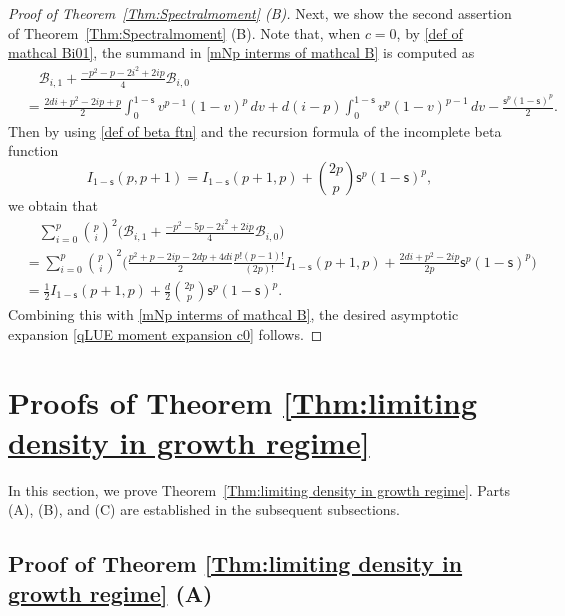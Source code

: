 \documentclass{amsart}
\theoremstyle{plain}
\theoremstyle{remark}
\numberwithin{equation}{section}
\begin{document}
\begin{proof}[Proof of Theorem~\ref{Thm:Spectralmoment} (B)]
    Next, we show the second assertion of Theorem~\ref{Thm:Spectralmoment} (B). 
    Note that, when $c=0$, by \eqref{def of mathcal Bi01}, the summand in \eqref{mNp interms of mathcal B} is computed as 
    \begin{align*}
        &\quad \mathcal{B}_{i,1}+\frac{-p^2-p-2i^2+2ip}{4}\mathcal{B}_{i,0}
        \\
        &=\frac{2di+p^2-2ip+p}{2}\int_{0}^{1- \mathsf{s} }v^{p-1}(1-v)^{p}\,dv+d(i-p)\int_{0}^{1-\mathsf{s} }v^{p}(1-v)^{p-1}\,dv-\frac{\mathsf{s}^{p}(1-\mathsf{s})^{p} }{2}.
    \end{align*}
    Then by using \eqref{def of beta ftn} and the recursion formula of the incomplete beta function \cite[Eq.~(8.17.18)]{NIST} 
    \begin{equation*}
        I_{1- \mathsf{s} }(p,p+1)=I_{1- \mathsf{s} }(p+1,p)+ \binom{2p}{p} \mathsf{s}^{p}(1-\mathsf{s})^{p} ,
    \end{equation*}
    we obtain that 
    \begin{align*}
        & \quad \sum_{i=0}^{p}\binom{p}{i}^{2} \Big(\mathcal{B}_{i,1}+\frac{-p^{2}-5p-2i^2+2ip}{4}\mathcal{B}_{i,0}\Big) 
        \\
        &=\sum_{i=0}^{p}\binom{p}{i}^{2}\Big(\frac{p^{2}+p-2ip-2dp+4di}{2}\frac{p!(p-1)!}{(2p)!}I_{1-\mathsf{s}}(p+1,p)+\frac{2di+p^{2}-2ip}{2p}\mathsf{s}^{p}(1-\mathsf{s})^{p} \Big)\\
        &= \frac{1}{2}I_{1-\mathsf{s}}(p+1,p)+\frac{d}{2}\binom{2p}{p}\mathsf{s}^{p}(1-\mathsf{s})^{p} .
    \end{align*}
    Combining this with \eqref{mNp interms of mathcal B}, the desired asymptotic expansion \eqref{qLUE moment expansion c0} follows. 
    \end{proof}
  





 

\section{Proofs of Theorem \ref{Thm:limiting density in growth regime}} \label{Section_Thm main proof}

In this section, we prove Theorem~\ref{Thm:limiting density in growth regime}. Parts (A), (B), and (C) are established in the subsequent subsections.

 

\subsection{Proof of Theorem \ref{Thm:limiting density in growth regime} (A)} \label{Subsec_Thm main (A)}
\end{document}
